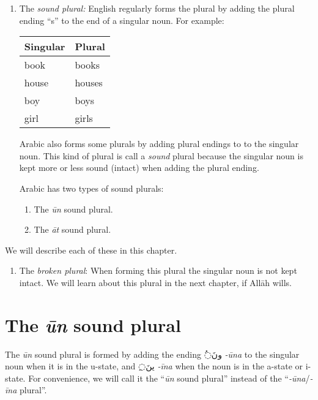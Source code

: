 \documentclass[
  10pt,
]{book}
\providecommand{\tightlist}{%
  \setlength{\itemsep}{0pt}\setlength{\parskip}{0pt}}
\begin{document}
\begin{enumerate}
\def\labelenumi{\arabic{enumi}.}
\item
  The \emph{sound plural:}
  English regularly forms the plural by adding the plural ending \enquote{s} to the end of a singular noun. For example:

  \begin{longtable}[]{@{}ll@{}}
  \toprule\noalign{}
  Singular & Plural \\
  \midrule\noalign{}
  \endhead
  \bottomrule\noalign{}
  \endlastfoot
  book & books \\
  house & houses \\
  boy & boys \\
  girl & girls \\
  \end{longtable}

  Arabic also forms some plurals by adding plural endings to to the singular noun. This kind of plural is call a \emph{sound} plural because the singular noun is kept more or less sound (intact) when adding the plural ending.

  Arabic has two types of sound plurals:

  \begin{enumerate}
  \def\labelenumii{\roman{enumii}.}
  \tightlist
  \item
    The \emph{ūn} sound plural.
  \item
    The \emph{āt} sound plural.
  \end{enumerate}
\end{enumerate}

We will describe each of these in this chapter.

\begin{enumerate}
\def\labelenumi{\arabic{enumi}.}
\setcounter{enumi}{1}
\tightlist
\item
  The \emph{broken plural}: When forming this plural the singular noun is not kept intact. We will learn about this plural in the next chapter, if Allāh wills.
\end{enumerate}

\section{\texorpdfstring{The \emph{ūn} sound plural}{The ūn sound plural}}\label{the-un-sound-plural}

The \emph{ūn} sound plural is formed by adding the ending \foreignlanguage{arabic}{◌ُونَ} \emph{-ūna} to the singular noun when it is in the u-state, and \foreignlanguage{arabic}{◌ِينَ} \emph{-īna} when the noun is in the a-state or i-state. For convenience, we will call it the \enquote{\emph{ūn} sound plural} instead of the \enquote{\emph{-ūna}/\emph{-īna} plural}.
\end{document}
